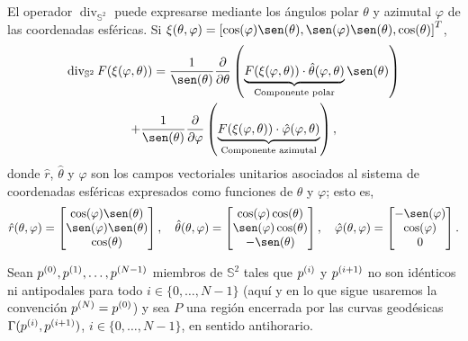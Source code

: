 \documentclass[reqno]{amsart}
\newcommand{\psp}[1]{\sp{(#1)}} %
\begin{document}
El operador $\operatorname{div}_{\mathbb{S}^2}$ puede expresarse mediante los ángulos polar $\theta$ y azimutal $\varphi$ de las coordenadas esféricas.
Si $\xi(\theta,\varphi) = \left[ \cos(\varphi) \sen(\theta), \sen(\varphi) \sen(\theta), \cos(\theta) \right]^T$,
%
\begin{multline}
\operatorname{div}_{\mathbb{S}^2} F(\xi(\varphi,\theta))
= \frac{1}{\sen(\theta)} \frac{\partial}{\partial \theta}\left( \underbrace{F(\xi(\varphi,\theta)) \cdot \hat \theta(\varphi,\theta)}_{\text{Componente polar}} \sen(\theta) \right)\\ + \frac{1}{\sen(\theta)} \frac{\partial}{\partial \varphi}\left( \underbrace{F(\xi(\varphi,\theta)) \cdot \hat \varphi(\varphi,\theta)}_{\text{Componente azimutal}} \right),
\end{multline}
%
donde $\hat r$, $\hat \theta$ y $\hat \varphi$ son los campos vectoriales unitarios asociados al sistema de coordenadas esféricas expresados como funciones de $\theta$ y $\varphi$; esto es,
%
\begin{equation*}
\hat r(\theta,\varphi) = \begin{bmatrix} \cos(\varphi) \sen(\theta)\\ \sen(\varphi) \sen(\theta)\\ \cos(\theta) \end{bmatrix}, \quad
\hat \theta(\theta,\varphi) = \begin{bmatrix} \cos(\varphi) \cos(\theta)\\ \sen(\varphi) \cos(\theta)\\ -\sen(\theta) \end{bmatrix}, \quad
\hat \varphi(\theta,\varphi) = \begin{bmatrix} -\sen(\varphi)\\ \cos(\varphi)\\ 0 \end{bmatrix}.
\end{equation*}
%

Sean $p\psp{0}, p\psp{1}, \dotsc, p\psp{N-1}$ miembros de $\mathbb{S}^2$ tales que $p\psp{i}$ y $p\psp{i+1}$ no son idénticos ni antipodales para todo $i \in \{0, \dotsc, N-1\}$ (aquí y en lo que sigue usaremos la convención $p\psp{N} = p\psp{0}$) y sea $P$ una región encerrada por las curvas geodésicas $\Gamma(p\psp{i}, p\psp{i+1})$, $i \in \{0, \dotsc, N-1\}$, en sentido antihorario.
\end{document}
